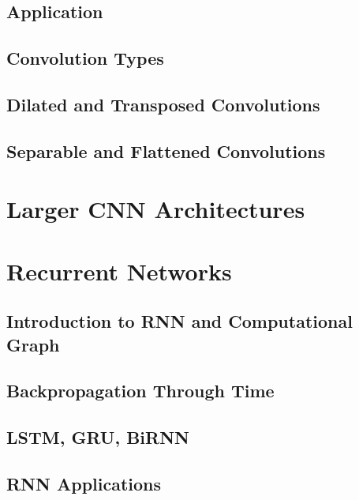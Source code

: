 \documentclass[13pt,compress]{beamer}
\begin{document}
\subsection{Application}
 
\subsection{Convolution Types}
 
\subsection{Dilated and Transposed Convolutions}
 
\subsection{Separable and Flattened Convolutions}
 
\section{Larger CNN Architectures}
 
 
\section{Recurrent Networks}
\subsection{Introduction to RNN  and Computational Graph}
 
\subsection{Backpropagation Through Time}
 
\subsection{LSTM, GRU, BiRNN}
 
\subsection{RNN Applications}
 
\end{document}
